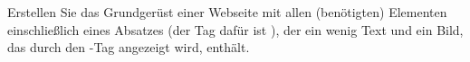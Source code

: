 %
\par Erstellen Sie das Grundgerüst einer Webseite mit allen (benötigten) Elementen einschließlich eines Absatzes (der Tag dafür ist ), der ein wenig Text und ein Bild, das durch den -Tag angezeigt wird, enthält.